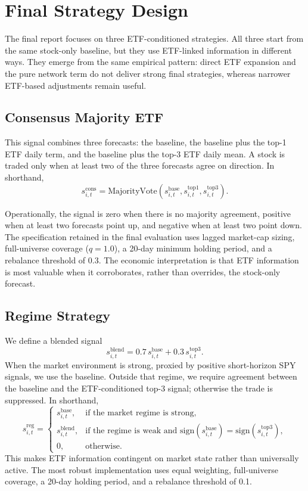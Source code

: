 \section{Final Strategy Design}
\label{sec:strategy}

The final report focuses on three ETF-conditioned strategies. All three start from the same stock-only baseline, but they use ETF-linked information in different ways. They emerge from the same empirical pattern: direct ETF expansion and the pure network term do not deliver strong final strategies, whereas narrower ETF-based adjustments remain useful.

\subsection{Consensus Majority ETF}

This signal combines three forecasts: the baseline, the baseline plus the top-1 ETF daily term, and the baseline plus the top-3 ETF daily mean. A stock is traded only when at least two of the three forecasts agree on direction. In shorthand,
\[
s^{\mathrm{cons}}_{i,t}
=
\mathrm{MajorityVote}
\left(
s^{\mathrm{base}}_{i,t},
s^{\mathrm{top1}}_{i,t},
s^{\mathrm{top3}}_{i,t}
\right).
\]

Operationally, the signal is zero when there is no majority agreement, positive when at least two forecasts point up, and negative when at least two point down. The specification retained in the final evaluation uses lagged market-cap sizing, full-universe coverage ($q=1.0$), a 20-day minimum holding period, and a rebalance threshold of 0.3. The economic interpretation is that ETF information is most valuable when it corroborates, rather than overrides, the stock-only forecast.

\subsection{Regime Strategy}

We define a blended signal
\[
s^{\mathrm{blend}}_{i,t} = 0.7\, s^{\mathrm{base}}_{i,t} + 0.3\, s^{\mathrm{top3}}_{i,t}.
\]
When the market environment is strong, proxied by positive short-horizon SPY signals, we use the baseline. Outside that regime, we require agreement between the baseline and the ETF-conditioned top-3 signal; otherwise the trade is suppressed. In shorthand,
\[
s^{\mathrm{reg}}_{i,t}
=
\begin{cases}
s^{\mathrm{base}}_{i,t}, & \text{if the market regime is strong},\\
s^{\mathrm{blend}}_{i,t}, & \text{if the regime is weak and } \mathrm{sign}(s^{\mathrm{base}}_{i,t})=\mathrm{sign}(s^{\mathrm{top3}}_{i,t}),\\
0, & \text{otherwise.}
\end{cases}
\]
This makes ETF information contingent on market state rather than universally active. The most robust implementation uses equal weighting, full-universe coverage, a 20-day holding period, and a rebalance threshold of 0.1.

